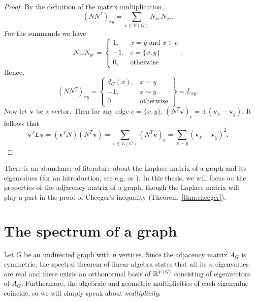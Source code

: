 \begin{proof}
    By the definition of the matrix multiplication, 
    \begin{equation*}
        (N N^T)_{xy} = \sum \limits_{e \in E(G)} N_{xe} N_{ye}.
    \end{equation*}
    For the summands we have 
    \begin{equation*}
        N_{xe} N_{ye} = \left\{\begin{array}{ll}
            1, & x = y \text{ and } x \in e \\
            -1, & e = \{ x, y \} \\
            0, & \text{otherwise }
        \end{array} \right. .
    \end{equation*}
    Hence, 
    \begin{equation*}
         (N N^T)_{xy} = \left\{\begin{array}{ll}
            d_G(x), & x = y \\
            -1, & x \sim y \\
            0, & \text{otherwise}
        \end{array} \right \} = L_{xy}.
    \end{equation*}
    Now let $\bm{v}$ be a vector. Then for any edge $e = \{x, y\}$, $(N^T \bm{v})_e = \pm (\bm{v}_x - \bm{v}_y)$.
    It follows that 
    \begin{equation*}
        \bm{v}^T L \bm{v} = (\bm{v}^T N) (N^T \bm{v}) = \sum \limits_{e \in E(G)} (N^T \bm{v})_e = \sum \limits_{x \sim y} (\bm{v}_x - \bm{v}_y)^2.
    \end{equation*}
\end{proof}

There is an abundance of literature about the Laplace matrix of a graph and its eigenvalues (for an introduction, see e.g. \cite{brouwerhaemers} or \cite[Chapter 13]{godsilroyle}).
In this thesis, we will focus on the properties of the adjacency matrix of a graph, though the Laplace matrix will play a part in the proof of Cheeger's inequality (\mbox{Theorem \ref{thm:cheeger}}).

\section{The spectrum of a graph}
Let $G$ be an undirected graph with $n$ vertices. 
Since the adjacency matrix $A_G$ is symmetric, the spectral theorem of linear algebra states that all its $n$ eigenvalues are real and there exists an orthonormal basis of $\mathbb{R}^{V(G)}$ consisting of eigenvectors of $A_G$. 
Furthermore, the algebraic and geometric multiplicities of each eigenvalue coincide, so we will simply speak about \textit{multiplicity}. 


